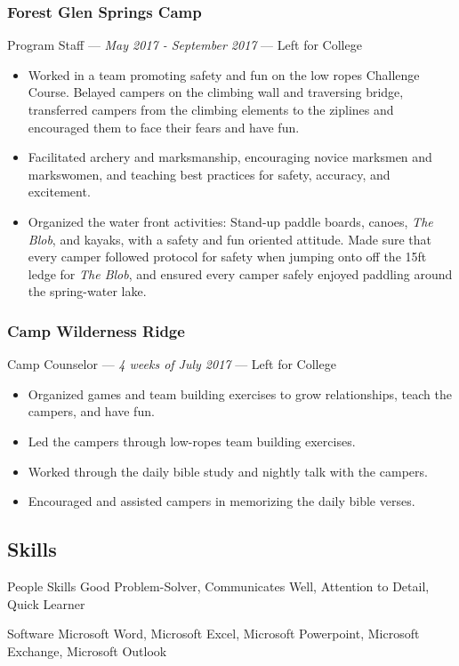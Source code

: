\documentclass[letterpaper,10pt]{article}
\begin{document}
\subsubsection{Forest Glen Springs Camp}
\hfill Program Staff --- \emph{May 2017 - September 2017} --- Left for College

\begin{itemize}
\tightlist{}
\item
	Worked in a team promoting safety and fun on the low ropes Challenge Course. Belayed campers on the climbing wall and traversing bridge, transferred campers from the climbing elements to the ziplines and encouraged them to face their fears and have fun.
\item
	Facilitated archery and marksmanship, encouraging novice marksmen and markswomen, and teaching best practices for safety, accuracy, and excitement.
\item
	Organized the water front activities: Stand-up paddle boards, canoes, \emph{The Blob}, and kayaks, with a safety and fun oriented attitude. Made sure that every camper followed protocol for safety when jumping onto off the 15ft ledge for \emph{The Blob}, and ensured every camper safely enjoyed paddling around the spring-water lake.
\end{itemize}

\subsubsection{Camp Wilderness Ridge}
\hfill Camp Counselor --- \emph{4 weeks of July 2017} --- Left for College

\begin{itemize}
\tightlist{}
\item
	Organized games and team building exercises to grow relationships, teach the campers, and have fun.
\item
	Led the campers through low-ropes team building exercises.
\item
	Worked through the daily bible study and nightly talk with the campers.
\item
	Encouraged and assisted campers in memorizing the daily bible verses.	
\end{itemize}

\subsection{Skills}

\begin{skills}
\item[People Skills]
  Good Problem-Solver, Communicates Well, Attention to Detail, Quick Learner
\item[Software]
  Microsoft Word, Microsoft Excel, Microsoft Powerpoint, Microsoft Exchange, Microsoft Outlook
\end{skills}
\end{document}
